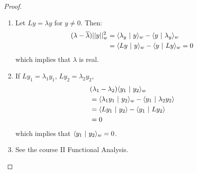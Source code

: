 \documentclass[../Main.tex]{subfiles}
\begin{document}
\begin{proof}
    \begin{enumerate}
        \item Let $Ly = \lambda y$ for $y \neq 0$. Then:
            \begin{align*}
                (\lambda - \overline{\lambda}) ||y||_w^2 &= \langle \lambda_y~\vert~y\rangle_w - \langle y~\vert~\lambda_y\rangle_w \\
                &= \langle Ly~\vert~y\rangle_w - \langle y~\vert~Ly\rangle_w = 0
            \end{align*}
            which implies that $\lambda$ is real.
        \item If $Ly_1 = \lambda_1 y_1$, $Ly_2 = \lambda_2 y_2$,
            \begin{align*}
                &(\lambda_1 - \lambda_2) \langle y_1~\vert~y_2\rangle_w \\
                &= \langle \lambda_1 y_1~\vert~y_2\rangle_w - \langle y_1~\vert~\lambda_2 y_2\rangle \\
                &= \langle Ly_1~\vert~y_2\rangle - \langle y_1~\vert~Ly_2\rangle \\
                &= 0
            \end{align*}
            which implies that $\langle y_1~\vert~y_2\rangle_w = 0$.
        \item See the course II Functional Analysis.
    \end{enumerate}
\end{proof}
\end{document}
